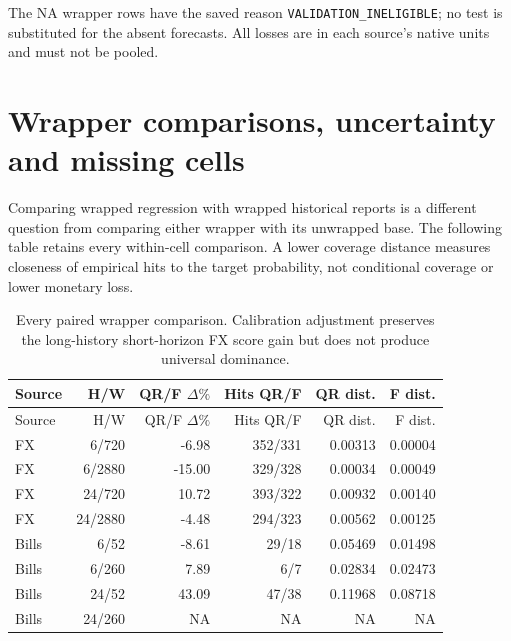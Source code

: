 \documentclass[11pt,a4paper]{article}
\begin{document}
The NA wrapper rows have the saved reason
\texttt{VALIDATION\_INELIGIBLE}; no test is substituted for the absent forecasts.
All losses are in each source's native units and must not be pooled.\section{Wrapper comparisons, uncertainty and missing cells}\label{sup:wp2-pairs}

Comparing wrapped regression with wrapped historical reports is a
different question from comparing either wrapper with its unwrapped base.
The following table retains every within-cell comparison. A lower coverage
distance measures closeness of empirical hits to the target probability, not
conditional coverage or lower monetary loss.
\begingroup
\small
\setlength{\tabcolsep}{3pt}
\renewcommand{\arraystretch}{1.12}
\begin{longtable}{lrrrrr}
\caption{Every paired wrapper comparison. Calibration adjustment preserves the long-history short-horizon FX score gain but does not produce universal dominance.}\\
\toprule
Source & H/W & QR/F \(\Delta\%\) & Hits QR/F & QR dist. & F dist. \\
\midrule
\endfirsthead
\toprule
Source & H/W & QR/F \(\Delta\%\) & Hits QR/F & QR dist. & F dist. \\
\midrule
\endhead
\bottomrule
\endfoot
FX & 6/720 & -6.98 & 352/331 & 0.00313 & 0.00004 \\
FX & 6/2880 & -15.00 & 329/328 & 0.00034 & 0.00049 \\
FX & 24/720 & 10.72 & 393/322 & 0.00932 & 0.00140 \\
FX & 24/2880 & -4.48 & 294/323 & 0.00562 & 0.00125 \\
Bills & 6/52 & -8.61 & 29/18 & 0.05469 & 0.01498 \\
Bills & 6/260 & 7.89 & 6/7 & 0.02834 & 0.02473 \\
Bills & 24/52 & 43.09 & 47/38 & 0.11968 & 0.08718 \\
Bills & 24/260 & NA & NA & NA & NA \\
\end{longtable}
\endgroup
\end{document}
